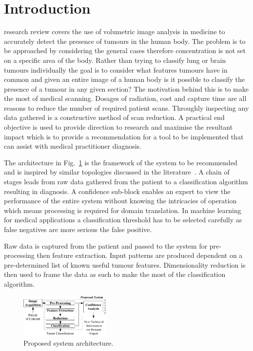 \documentclass[journal]{IEEEtran}
\begin{document}
\IEEEpeerreviewmaketitle







\section{Introduction}
 research review covers the use of volumetric image analysis in medicine to accurately detect the presence of tumours in the human body. 
The problem is to be approached by considering the general cases therefore concentration is not set on a specific area of the body.
Rather than trying to classify lung or brain tumours individually the goal is to consider what features tumours have in common and given an entire image of a human body is it possible to classify the presence of a tumour in any given section?
The motivation behind this is to make the most of medical scanning.
Dosages of radiation, cost and capture time are all reasons to reduce the number of required patient scans.
Throughly inspecting any data gathered is a constructive method of scan reduction.
A practical end objective is used to provide direction to research and maximise the resultant impact which is to provide a recommendation for a tool to be implemented that can assist with medical practitioner diagnosis.  

The architecture in Fig.~\ref{fig:Proposed} is the framework of the system to be recommended and is inspired by similar topologies discussed in the literature~\cite{ahmed2011efficacy,kumar2011classification,hau07feat,sachdeva2011multiclass,kostis03three}.
A chain of stages leads from raw data gathered from the patient to a classification algorithm resulting in diagnosis.
A confidence sub-block enables an expert to view the performance of the entire system without knowing the intricacies of operation which means processing is required for domain translation.
In machine learning for medical applications a classification threshold has to be selected carefully as false negatives are more serious the false positive.

Raw data is captured from the patient and passed to the system for pre-processing then feature extraction.
Input patterns are produced dependent on a pre-determined list of known useful tumour features. 
Dimensionality reduction is then used to frame the data as such to make the most of the classification algorithm.

\begin{figure}[!htb]
   \centering
   \includegraphics[width = 0.4\textwidth]{Figures/Proposed.pdf}
   \caption{Proposed system architecture.}
   \label{fig:Proposed}
\end{figure}
\end{document}
